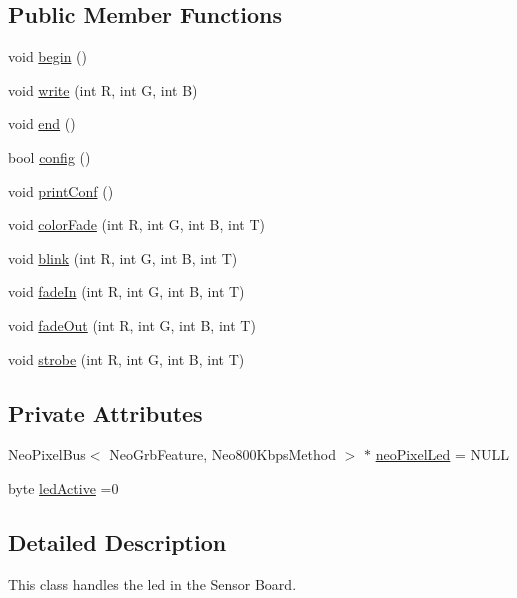 \subsection*{Public Member Functions}
\begin{DoxyCompactItemize}
\item 
void \hyperlink{classCoolBoardLed_ae3cbde8affcc6f011cbd698c8ef911f6}{begin} ()
\item 
void \hyperlink{classCoolBoardLed_a30fadd4cbec17ceea428bf7a32207e87}{write} (int R, int G, int B)
\item 
void \hyperlink{classCoolBoardLed_a69f323359e0c9f797422f2152b5d41ef}{end} ()
\item 
bool \hyperlink{classCoolBoardLed_a1b60e5e30bea96c49ed62ed1bf1ffc8b}{config} ()
\item 
void \hyperlink{classCoolBoardLed_a8ed3053a36f0ed4a131f43b5b17efb61}{print\+Conf} ()
\item 
void \hyperlink{classCoolBoardLed_a6dbfe23988f43e1242cd05e69b13ff30}{color\+Fade} (int R, int G, int B, int T)
\item 
void \hyperlink{classCoolBoardLed_a27706bc029f6a126c55d0b91624ad7fa}{blink} (int R, int G, int B, int T)
\item 
void \hyperlink{classCoolBoardLed_aec915442a8441c7cd45c3279d3ff8821}{fade\+In} (int R, int G, int B, int T)
\item 
void \hyperlink{classCoolBoardLed_a27c4e14fa2cd3639c0844152cea98887}{fade\+Out} (int R, int G, int B, int T)
\item 
void \hyperlink{classCoolBoardLed_adc08c0ac07473499971c503d300f0413}{strobe} (int R, int G, int B, int T)
\end{DoxyCompactItemize}
\subsection*{Private Attributes}
\begin{DoxyCompactItemize}
\item 
Neo\+Pixel\+Bus$<$ Neo\+Grb\+Feature, Neo800\+Kbps\+Method $>$ $\ast$ \hyperlink{classCoolBoardLed_ac2c13fa462a010cd9242bf297c013923}{neo\+Pixel\+Led} = N\+U\+LL
\item 
byte \hyperlink{classCoolBoardLed_a5f17c135516fcf4b44ea8a096ba0177a}{led\+Active} =0
\end{DoxyCompactItemize}


\subsection{Detailed Description}
This class handles the led in the Sensor Board. 

